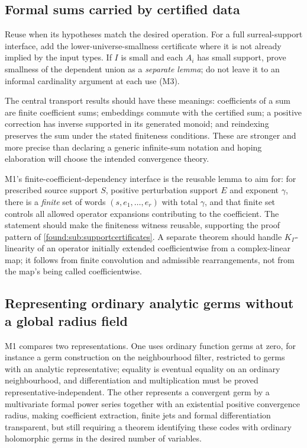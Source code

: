 \documentclass[11pt,letterpaper]{article}
\numberwithin{equation}{section}
\theoremstyle{definition}
\theoremstyle{remark}
\begin{document}
\subsection{Formal sums carried by certified data}
\label{found:sub:certifieddata}
Reuse  when its hypotheses match the desired
operation. For a full surreal-support interface, add the
lower-universe-smallness certificate where it is not already implied by the
input types. If $I$ is small and each $A_i$ has small support, prove smallness
of the dependent union as a \emph{separate lemma}; do not leave it to an
informal cardinality argument at each use (M3).

The central transport results should have these meanings: coefficients of a sum
are finite coefficient sums; embeddings commute with the certified sum; a
positive correction has inverse supported in its generated monoid; and
reindexing preserves the sum under the stated finiteness conditions. These are
stronger and more precise than declaring a generic infinite-sum notation and
hoping elaboration will choose the intended convergence theory.

M1's finite-coefficient-dependency interface is the reusable lemma to aim for:
for prescribed source support $S$, positive perturbation support $E$ and
exponent $\gamma$, there is a \emph{finite} set of words
$(s,e_1,\ldots,e_r)$ with total $\gamma$, and that finite set controls all
allowed operator expansions contributing to the coefficient. The statement should
make the finiteness witness reusable, supporting the proof pattern of
\cref{found:sub:supportcertificates}. A separate theorem should handle
$K_\Gamma$-linearity of an operator initially extended coefficientwise from a
complex-linear map; it follows from finite convolution and admissible
rearrangements, not from the map's being called coefficientwise.

\subsection{Representing ordinary analytic germs without a global radius field}
\label{found:sub:germrepresentation}
M1 compares two representations. One uses ordinary function germs at zero, for
instance a germ construction on the neighbourhood filter, restricted to germs
with an analytic representative; equality is eventual equality on an ordinary
neighbourhood, and differentiation and multiplication must be proved
representative-independent. The other represents a convergent germ by a
multivariate formal power series together with an existential positive
convergence radius, making coefficient extraction, finite jets and formal
differentiation transparent, but still requiring a theorem identifying these
codes with ordinary holomorphic germs in the desired number of variables.
\end{document}
